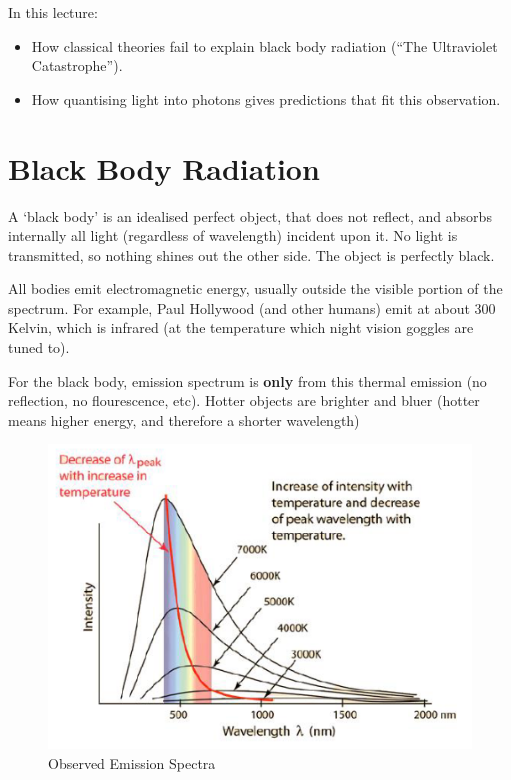 
In this lecture:
\begin{itemize}
    \item How classical theories fail to explain black body radiation (``The Ultraviolet Catastrophe'').
    \item How quantising light into photons gives predictions that fit this observation.
\end{itemize}

\section*{Black Body Radiation}
A `black body' is an idealised perfect object, that does not reflect, and absorbs internally all light (regardless of wavelength) incident upon it. No light is transmitted, so nothing shines out the other side. The object is perfectly black.

All bodies emit electromagnetic energy, usually outside the visible portion of the spectrum. For example, Paul Hollywood (and other humans) emit at about 300 Kelvin, which is infrared (at the temperature which night vision goggles are tuned to).

For the black body, emission spectrum is \textbf{only} from this thermal emission (no reflection, no flourescence, etc). Hotter objects are brighter and bluer (hotter means higher energy, and therefore a shorter wavelength)

\begin{figure}[H]
    \centering
    \includegraphics{figures/lec02-01.png}
     \caption{Observed Emission Spectra}
\end{figure}

